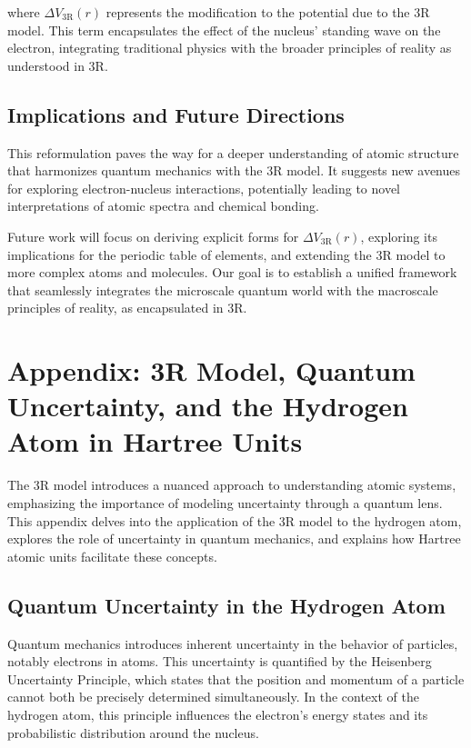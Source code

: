 \documentclass[12pt]{article}
\begin{document}
where $\Delta V_{\text{3R}}(r)$ represents the modification to the potential due to the 3R model. This term encapsulates the effect of the nucleus' standing wave on the electron, integrating traditional physics with the broader principles of reality as understood in 3R.

\subsection{Implications and Future Directions}

This reformulation paves the way for a deeper understanding of atomic structure that harmonizes quantum mechanics with the 3R model. It suggests new avenues for exploring electron-nucleus interactions, potentially leading to novel interpretations of atomic spectra and chemical bonding.

Future work will focus on deriving explicit forms for $\Delta V_{\text{3R}}(r)$, exploring its implications for the periodic table of elements, and extending the 3R model to more complex atoms and molecules. Our goal is to establish a unified framework that seamlessly integrates the microscale quantum world with the macroscale principles of reality, as encapsulated in 3R.


\section*{Appendix: 3R Model, Quantum Uncertainty, and the Hydrogen Atom in Hartree Units}

The 3R model introduces a nuanced approach to understanding atomic systems, emphasizing the importance of modeling uncertainty through a quantum lens. This appendix delves into the application of the 3R model to the hydrogen atom, explores the role of uncertainty in quantum mechanics, and explains how Hartree atomic units facilitate these concepts.

\subsection*{Quantum Uncertainty in the Hydrogen Atom}

Quantum mechanics introduces inherent uncertainty in the behavior of particles, notably electrons in atoms. This uncertainty is quantified by the Heisenberg Uncertainty Principle, which states that the position and momentum of a particle cannot both be precisely determined simultaneously. In the context of the hydrogen atom, this principle influences the electron's energy states and its probabilistic distribution around the nucleus.
\end{document}
